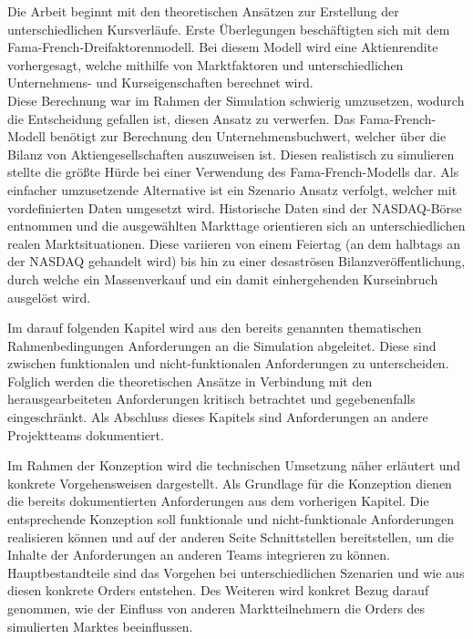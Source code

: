 	
	Die Arbeit beginnt mit den theoretischen Ansätzen zur Erstellung der unterschiedlichen Kursverläufe. Erste Überlegungen beschäftigten sich mit dem Fama-French-Dreifaktorenmodell. Bei diesem Modell wird eine Aktienrendite vorhergesagt, welche mithilfe von Marktfaktoren und unterschiedlichen Unternehmens- und Kurseigenschaften berechnet wird.\\
	Diese Berechnung war im Rahmen der Simulation schwierig umzusetzen, wodurch die Entscheidung gefallen ist, diesen Ansatz zu verwerfen. Das Fama-French-Modell benötigt zur Berechnung den Unternehmensbuchwert, welcher über die Bilanz von Aktiengesellschaften auszuweisen ist. Diesen realistisch zu simulieren stellte die größte Hürde bei einer Verwendung des Fama-French-Modells dar. Als einfacher umzusetzende Alternative ist ein Szenario Ansatz verfolgt, welcher mit vordefinierten Daten umgesetzt wird. Historische Daten sind der NASDAQ-Börse entnommen und die ausgewählten Markttage orientieren sich an unterschiedlichen realen Marktsituationen. Diese variieren von einem Feiertag (an dem halbtags an der NASDAQ gehandelt wird) bis hin zu einer desaströsen Bilanzveröffentlichung, durch welche ein Massenverkauf und ein damit einhergehenden Kurseinbruch ausgelöst wird.
	
	
	Im darauf folgenden Kapitel wird aus den bereits genannten thematischen Rahmenbedingungen Anforderungen an die Simulation abgeleitet. Diese sind zwischen funktionalen und nicht-funktionalen Anforderungen zu unterscheiden. Folglich werden die theoretischen Ansätze in Verbindung mit den herausgearbeiteten Anforderungen kritisch betrachtet und gegebenenfalls eingeschränkt. Als Abschluss dieses Kapitels sind Anforderungen an andere Projektteams dokumentiert.
	
	
	Im Rahmen der Konzeption wird die technischen Umsetzung näher erläutert und konkrete Vorgehensweisen dargestellt. Als Grundlage für die Konzeption dienen die bereits dokumentierten Anforderungen aus dem vorherigen Kapitel. Die entsprechende Konzeption soll funktionale und nicht-funktionale Anforderungen realisieren können und auf der anderen Seite Schnittstellen bereitstellen, um die Inhalte der Anforderungen an anderen Teams integrieren zu können. Hauptbestandteile sind das Vorgehen bei unterschiedlichen Szenarien und wie aus diesen konkrete Orders entstehen. Des Weiteren wird konkret Bezug darauf genommen, wie der Einfluss von anderen Marktteilnehmern die Orders des simulierten Marktes beeinflussen.
	
